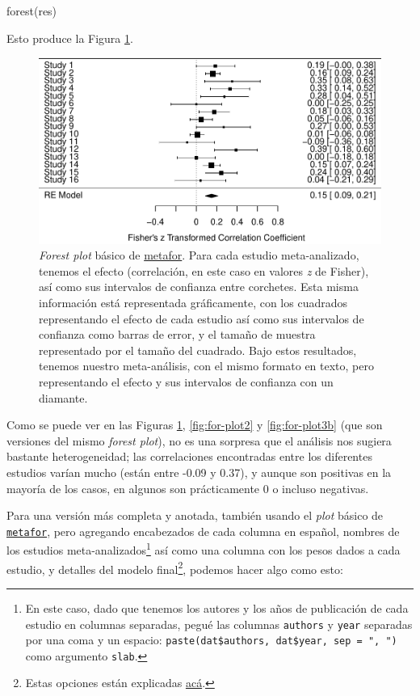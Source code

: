 \documentclass[
  bookmarksnumbered]{article}
\newenvironment{Shaded}{\begin{snugshade}}{\end{snugshade}}
\newcommand{\FunctionTok}[1]{\textcolor[rgb]{0.39,0.29,0.61}{#1}}
\newcommand{\NormalTok}[1]{\textcolor[rgb]{0.12,0.11,0.11}{#1}}
\begin{document}
\begin{Shaded}
\begin{Highlighting}[]
\FunctionTok{forest}\NormalTok{(res)}
\end{Highlighting}
\end{Shaded}

Esto produce la Figura \ref{fig:for-plot1}.

\begin{figure}
\centering
\includegraphics{Meta-analysis_files/figure-latex/for-plot1-1.pdf}
\caption{\label{fig:for-plot1}\emph{Forest plot} básico de \href{https://www.metafor-project.org/doku.php}{metafor}. Para cada estudio meta-analizado, tenemos el efecto (correlación, en este caso en valores \emph{z} de Fisher), así como sus intervalos de confianza entre corchetes. Esta misma información está representada gráficamente, con los cuadrados representando el efecto de cada estudio así como sus intervalos de confianza como barras de error, y el tamaño de muestra representado por el tamaño del cuadrado. Bajo estos resultados, tenemos nuestro meta-análisis, con el mismo formato en texto, pero representando el efecto y sus intervalos de confianza con un diamante.}
\end{figure}

Como se puede ver en las Figuras \ref{fig:for-plot1}, \ref{fig:for-plot2} y \ref{fig:for-plot3b} (que son versiones del mismo \emph{forest plot}), no es una sorpresa que el análisis nos sugiera bastante heterogeneidad; las correlaciones encontradas entre los diferentes estudios varían mucho (están entre -0.09 y 0.37), y aunque son positivas en la mayoría de los casos, en algunos son prácticamente 0 o incluso negativas.

Para una versión más completa y anotada, también usando el \emph{plot} básico de \href{https://www.metafor-project.org/doku.php}{\texttt{metafor}}, pero agregando encabezados de cada columna en español, nombres de los estudios meta-analizados\footnote{En este caso, dado que tenemos los autores y los años de publicación de cada estudio en columnas separadas, pegué las columnas \texttt{authors} y \texttt{year} separadas por una coma y un espacio: \texttt{paste(dat\$authors,\ dat\$year,\ sep\ =\ ",\ ")} como argumento \texttt{slab}.} así como una columna con los pesos dados a cada estudio, y detalles del modelo final\footnote{Estas opciones están explicadas \href{https://search.r-project.org/CRAN/refmans/metafor/html/forest.rma.html}{acá}.}, podemos hacer algo como esto:
\end{document}
